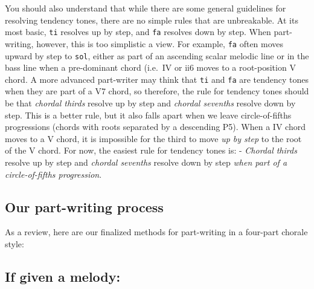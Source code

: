 \documentclass{book}
\begin{document}
You should also understand that while there are some general guidelines for
resolving tendency tones, there are no simple rules that are unbreakable. At
its most basic, \texttt{ti} resolves up by step, and \texttt{fa} resolves down
by step. When part-writing, however, this is too simplistic a view. For
example, \texttt{fa} often moves upward by step to \texttt{sol}, either as
part of an ascending scalar melodic line or in the bass line when a
pre-dominant chord (i.e.~IV or ii6 moves to a root-position V chord. A more
advanced part-writer may think that \texttt{ti} and \texttt{fa} are tendency
tones when they are part of a V7 chord, so therefore, the rule for tendency
tones should be that \emph{chordal thirds} resolve up by step and
\emph{chordal sevenths} resolve down by step. This is a better rule, but it
also falls apart when we leave circle-of-fifths progressions (chords with
roots separated by a descending P5). When a IV chord moves to a V chord, it is
impossible for the third to move \emph{up by step} to the root of the V chord.
For now, the easiest rule for tendency tones is: - \emph{Chordal thirds}
resolve up by step and \emph{chordal sevenths} resolve down by step \emph{when
part of a circle-of-fifths progression}.

\hypertarget{our-part-writing-process}{%
\subsection{Our part-writing process}\label{our-part-writing-process}}

As a review, here are our finalized methods for part-writing in a four-part
chorale style:

\hypertarget{if-given-a-melody}{%
\subsection{If given a melody:}\label{if-given-a-melody}}
\end{document}
